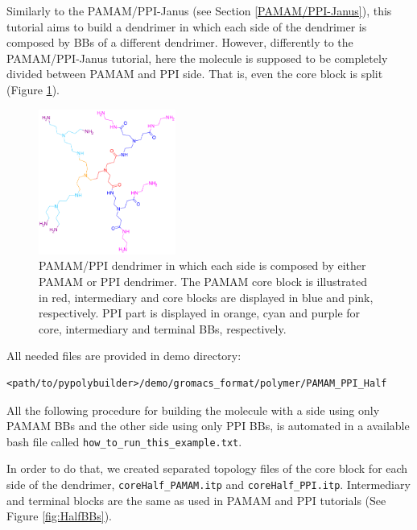 
Similarly to the PAMAM/PPI-Janus (see Section \ref{PAMAM/PPI-Janus}), this tutorial aims to build a dendrimer in which each side of the dendrimer is composed by BBs of a different dendrimer.
However, differently to the PAMAM/PPI-Janus tutorial, here the molecule is supposed to be completely divided between PAMAM and PPI side.
That is, even the core block is split (Figure \ref{fig:Half}).

\begin{figure}
    \centering
    \includegraphics[width=0.4\textwidth]{PAMAM_PPI-half/PAMAMPPIPOL.png}
    \caption{PAMAM/PPI dendrimer in which each side is composed by either PAMAM or PPI dendrimer. The PAMAM core block is illustrated in red, intermediary and core blocks are displayed in blue and pink, respectively. PPI part is displayed in orange, cyan and purple for core, intermediary and terminal BBs, respectively. }
    \label{fig:Half}
\end{figure}

All needed files are provided in demo directory:

\begin{lstlisting}
<path/to/pypolybuilder>/demo/gromacs_format/polymer/PAMAM_PPI_Half
\end{lstlisting}

All the following procedure for building the molecule with a side using only PAMAM BBs and the other side using only PPI BBs, is automated in a available bash file called \texttt{how\_to\_run\_this\_example.txt}.

In order to do that, we created separated topology files of the core block for each side of the dendrimer, \texttt{coreHalf\_PAMAM.itp} and \texttt{coreHalf\_PPI.itp}.
Intermediary and terminal blocks are the same as used in PAMAM and PPI tutorials (See Figure \ref{fig:HalfBBs}).

